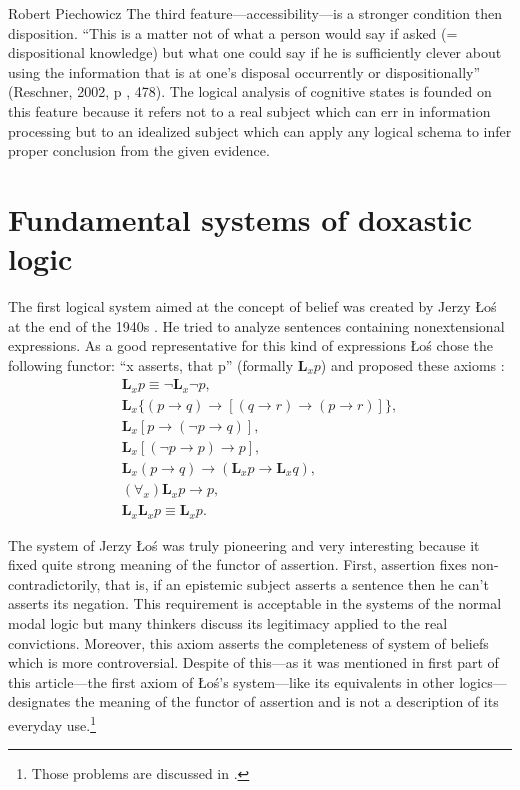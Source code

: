 \begin{artengenv}{Robert Piechowicz}
The third feature---accessibility---is a stronger condition then disposition. ``This is a matter not of what a person would say if asked (= dispositional knowledge) but what one could say if he is sufficiently clever about using the information that is at one’s disposal occurrently or dispositionally''
(Reschner, 2002, p , 478).
\parencite[][p.478]{jacquette_epistemic_2002}
The logical analysis of cognitive states is founded on this feature because it refers not to a real subject which can err in information processing but to an idealized subject which can apply any logical schema to infer proper conclusion from the given evidence.
	
\section{Fundamental systems of doxastic logic}

\indent The first logical system aimed at the concept of belief was created by Jerzy \L{}o\'{s} at the end of the 1940s
\parencite{los_logiki_1948}.
He tried to analyze sentences containing nonextensional expressions. As a good representative for this kind of expressions \L{}o\'{s} chose the following functor: ``x asserts, that p'' (formally $\mathbf{L}_{x}p$) and proposed these axioms
\parencite[see][p.251]{lechniak_przekonania_2011}:
\begin{gather}
	\mathbf{L}_{x}p\equiv \neg \mathbf{L}_{x}\neg p,\tag*{1.} \\
	\mathbf{L}_{x}\{(p\rightarrow q)\rightarrow [(q\rightarrow r)\rightarrow (p\rightarrow r)]\},\tag*{2.}\\
	\mathbf{L}_{x}[p\rightarrow (\neg p\rightarrow q)],\tag*{3.}\\
	\mathbf{L}_{x}[(\neg p\rightarrow p)\rightarrow p],\tag*{4.}\\
	\mathbf{L}_{x}(p\rightarrow q)\rightarrow (\mathbf{L}_{x}p\rightarrow \mathbf{L}_{x}q),\tag*{5.}\\
	(\forall_{x})\mathbf{L}_{x}p\rightarrow  p,\tag*{6.}\\
	\mathbf{L}_{x}\mathbf{L}_{x} p\equiv\mathbf{ L}_{x}p.\tag*{7.}
\end{gather}

The system of Jerzy \L{}o\'{s} was truly pioneering and very interesting because it fixed quite strong meaning of the functor of assertion. First, assertion fixes non-contradictorily, that is, if an epistemic subject asserts a sentence then he can’t asserts its negation. This requirement is acceptable in the systems of the normal modal logic but many thinkers discuss its legitimacy applied to the real convictions. Moreover, this axiom asserts the completeness of system of beliefs which is more controversial. Despite of this---as it was mentioned in first part of this article---the first axiom of \L{}o\'{s}’s system---like its equivalents in other logics---designates the meaning of the functor of assertion and is not a description of its everyday use.\footnote{Those problems are discussed in
\parencites[][p.80-82, 93-94]{marciszewski_podstawy_1972}{poczobut_sprzecznosci_1999}.}


\end{artengenv}
